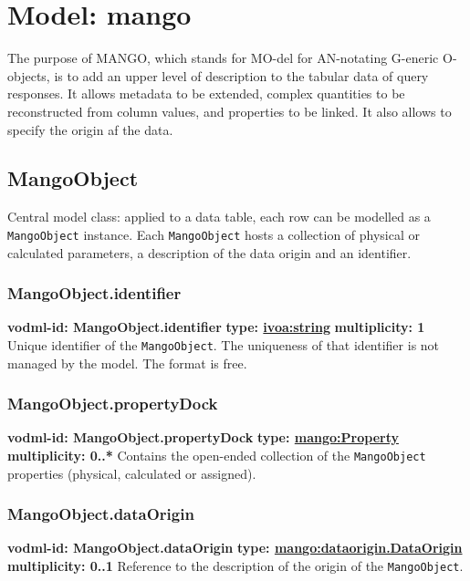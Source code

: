 \pagebreak

\section{Model: mango}
    The purpose of MANGO, which stands for MO-del for AN-notating G-eneric O-objects, is to add an upper level of description to the tabular data of query responses. It allows metadata to be extended, complex quantities to be reconstructed from column values, and properties to be linked. It also allows to specify the origin af the data.

  \subsection{MangoObject}
    \label{sect:MangoObject}
    Central model class: applied to a data table, each row can be modelled as a \texttt{MangoObject} instance. Each \texttt{MangoObject} hosts a collection of physical or calculated parameters, a description of the data origin and an identifier.

    \subsubsection{MangoObject.identifier}
    \textbf{vodml-id: MangoObject.identifier} \newline
    \textbf{type: \hyperref[sect:ivoa]{ivoa:string}} \newline
    \textbf{multiplicity: 1} \newline
    Unique identifier of the \texttt{MangoObject}. The uniqueness of that identifier is not managed by the model. The format is free.

    \subsubsection{MangoObject.propertyDock}
    \textbf{vodml-id: MangoObject.propertyDock} \newline
    \textbf{type: \hyperref[sect:Property]{mango:Property}} \newline
    \textbf{multiplicity: 0..*} \newline
    Contains the open-ended collection of the \texttt{MangoObject} properties (physical, calculated or assigned).

    \subsubsection{MangoObject.dataOrigin}
    \textbf{vodml-id: MangoObject.dataOrigin} \newline
    \textbf{type: \hyperref[sect:dataorigin.DataOrigin]{mango:dataorigin.DataOrigin}} \newline
    \textbf{multiplicity: 0..1} \newline
    Reference to the description of the origin of the \texttt{MangoObject}.

